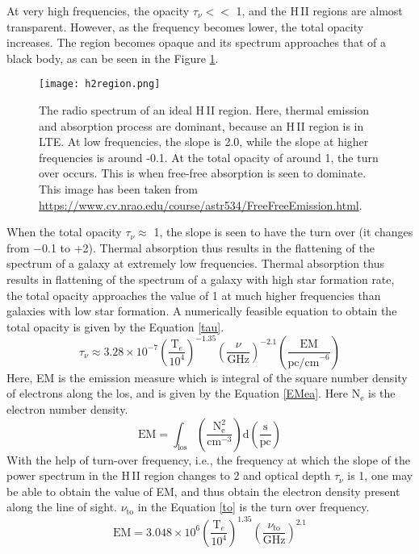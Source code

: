 \documentclass[../main/thesis_msc.tex]{subfiles}
\begin{document}
\begin{itemize}
At very high frequencies, the opacity $\tau_{\nu} << $ 1, and the H\,II regions are almost transparent. However, as the frequency becomes lower, the total opacity increases. The region becomes opaque and its spectrum approaches that of a black body, as can be seen in the Figure \ref{h2re}. 
\begin{figure}
\centering
\texttt{[image: h2region.png]}
\caption{The radio spectrum of an ideal H\,II region. Here, thermal emission and absorption process are dominant, because an H\,II region is in LTE. At low frequencies, the slope is 2.0, while the slope at higher frequencies is around -0.1. At the total opacity of around 1, the turn over occurs. This is when free-free absorption is seen to dominate. This image has been taken from \url{https://www.cv.nrao.edu/course/astr534/FreeFreeEmission.html}.}
\label{h2re}
\end{figure}
When the total opacity $\tau_{\nu} \approx$ 1, the slope is seen to have the turn over (it changes from $-$0.1 to +2). Thermal absorption thus results in the flattening of the spectrum of a galaxy at extremely low frequencies. Thermal absorption thus results in flattening of the spectrum of a galaxy with high star formation rate, the total opacity approaches the value of 1 at much higher frequencies than galaxies with low star formation. A numerically feasible equation to obtain the total opacity is given by the Equation \ref{tau}. 
\begin{equation}
\tau_{\nu} \approx 3.28 \times 10^{-7} \left(\frac{\textrm{T}_e}{10^4}\right)^{-1.35}\left(\frac{\nu}{\textrm{GHz}}\right)^{-2.1}\left(\frac{\textrm{EM}}{\textrm{pc/cm}^{-6}}\right)
\label{tau}
\end{equation}
Here, EM is the emission measure which is integral of the square number density of electrons along the los, and is given by the Equation \ref{EMea}. Here N$_{\text{e}}$ is the electron number density. 
\begin{equation}
\text{EM} = \int_{\text{los}} \left(\frac{\text{N}_{\text{e}}^2}{\text{cm}^{-3}} \right) \text{d}\left(\frac{\text{s}}{\text{pc}}\right)
\label{EMea}
\end{equation}
With the help of turn-over frequency, i.e., the frequency at which the slope of the power spectrum in the H\,II region changes to 2 and optical depth $\tau_{\nu}$ is 1, one may be able to obtain the value of EM, and thus obtain the electron density present along the line of sight. $\nu_{\text{to}}$ in the Equation \ref{to} is the turn over frequency.
\begin{equation}
\text{EM}=3.048\times10^{6} \left(\frac{\textrm{T}_e}{10^4}\right)^{1.35}\left(\frac{\nu_{\text{to}}}{\textrm{GHz}}\right)^{2.1}
\label{to}
\end{equation}


\end{itemize}
\end{document}
